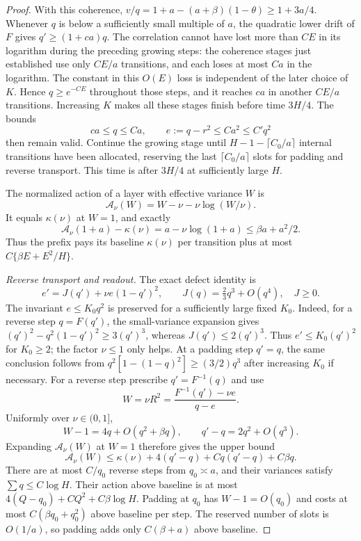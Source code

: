 \begin{proof}
With this coherence, $v/q=1+a-(a+\beta)(1-\theta)\ge1+3a/4$. Whenever $q$ is below a sufficiently small multiple of $a$, the quadratic lower drift of $F$ gives $q'\ge(1+ca)q$. The correlation cannot have lost more than $CE$ in its logarithm during the preceding growing steps: the coherence stages just established use only $CE/a$ transitions, and each loses at most $Ca$ in the logarithm. The constant in this $O(E)$ loss is independent of the later choice of $K$. Hence $q\ge e^{-CE}$ throughout those steps, and it reaches $ca$ in another $CE/a$ transitions. Increasing $K$ makes all these stages finish before time $3H/4$. The bounds
\[
 ca\le q\le Ca,\qquad e:=q-r^2\le Ca^2\le C'q^2
\]
then remain valid. Continue the growing stage until $H-1-\lceil C_0/a\rceil$ internal transitions have been allocated, reserving the last $\lceil C_0/a\rceil$ slots for padding and reverse transport. This time is after $3H/4$ at sufficiently large $H$.

The normalized action of a layer with effective variance $W$ is
\[
 \mathcal A_\nu(W)=W-\nu-\nu\log(W/\nu).
\]
It equals $\kappa(\nu)$ at $W=1$, and exactly
\[
 \mathcal A_\nu(1+a)-\kappa(\nu)
       =a-\nu\log(1+a)\le\beta a+a^2/2.
\]
Thus the prefix pays its baseline $\kappa(\nu)$ per transition plus at most $C\{\beta E+E^2/H\}$.

\emph{Reverse transport and readout.}
The exact defect identity is
\[
 e'=J(q')+\nu e(1-q')^2,
 \qquad J(q)=\tfrac23q^3+O(q^4),\quad J\ge0.
\]
The invariant $e\le K_0q^2$ is preserved for a sufficiently large fixed $K_0$. Indeed, for a reverse step $q=F(q')$, the small-variance expansion gives $(q')^2-q^2(1-q')^2\ge3(q')^3$, whereas $J(q')\le2(q')^3$. Thus $e'\le K_0(q')^2$ for $K_0\ge2$; the factor $\nu\le1$ only helps. At a padding step $q'=q$, the same conclusion follows from $q^2[1-(1-q)^2]\ge(3/2)q^3$ after increasing $K_0$ if necessary. For a reverse step prescribe $q'=F^{-1}(q)$ and use
\[
 W=\nu R^2=\frac{F^{-1}(q')-\nu e}{q-e}.
\]
Uniformly over $\nu\in(0,1]$,
\[
 W-1=4q+O(q^2+\beta q),\qquad q'-q=2q^2+O(q^3).
\]
Expanding $\mathcal A_\nu(W)$ at $W=1$ therefore gives the upper bound
\[
 \mathcal A_\nu(W)
 \le\kappa(\nu)+4(q'-q)+Cq(q'-q)+C\beta q.
\]
There are at most $C/q_0$ reverse steps from $q_0\asymp a$, and their variances satisfy $\sum q\le C\log H$. Their action above baseline is at most
$4(Q-q_0)+CQ^2+C\beta\log H$.
Padding at $q_0$ has $W-1=O(q_0)$ and costs at most $C(\beta q_0+q_0^2)$ above baseline per step. The reserved number of slots is $O(1/a)$, so padding adds only $C(\beta+a)$ above baseline.


\end{proof}
